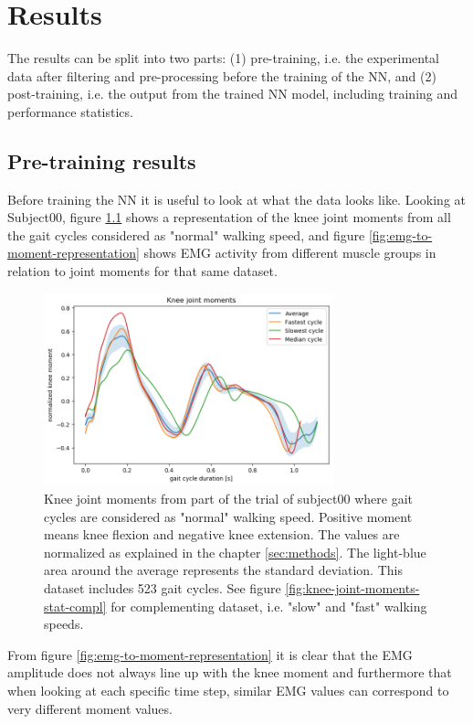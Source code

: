 \documentclass[../main.tex]{subfiles}
\begin{document}
\chapter{Results}
The results can be split into two parts: (1) pre-training, i.e. the experimental data after filtering and pre-processing before the training of the \ac{NN}, and (2) post-training, i.e. the output from the trained \ac{NN} model, including training and performance statistics.

\section{Pre-training results}
Before training the \ac{NN} it is useful to look at what the data looks like.
Looking at Subject00, figure \ref{fig:knee-joint-moments-stat} shows a representation of the knee joint moments from all the gait cycles considered as "normal" walking speed, and figure \ref{fig:emg-to-moment-representation} shows \ac{EMG} activity from different muscle groups in relation to joint moments for that same dataset.
\begin{figure}
    \centering
    \includegraphics[width=0.75\textwidth]{img/results/20190429_06_moments_normal_walk.png}
    \caption{Knee joint moments from part of the trial of subject00 where gait cycles are considered as "normal" walking speed. Positive moment means knee flexion and negative knee extension. The values are normalized as explained in the chapter \ref{sec:methods}. The light-blue area around the average represents the standard deviation. This dataset includes 523 gait cycles. See figure \ref{fig:knee-joint-moments-stat-compl} for complementing dataset, i.e. "slow" and "fast" walking speeds. }
    \label{fig:knee-joint-moments-stat}
\end{figure}
From figure \ref{fig:emg-to-moment-representation} it is clear that the \ac{EMG} amplitude does not always line up with the knee moment and furthermore that when looking at each specific time step, similar \ac{EMG} values can correspond to very different moment values. 
\end{document}
